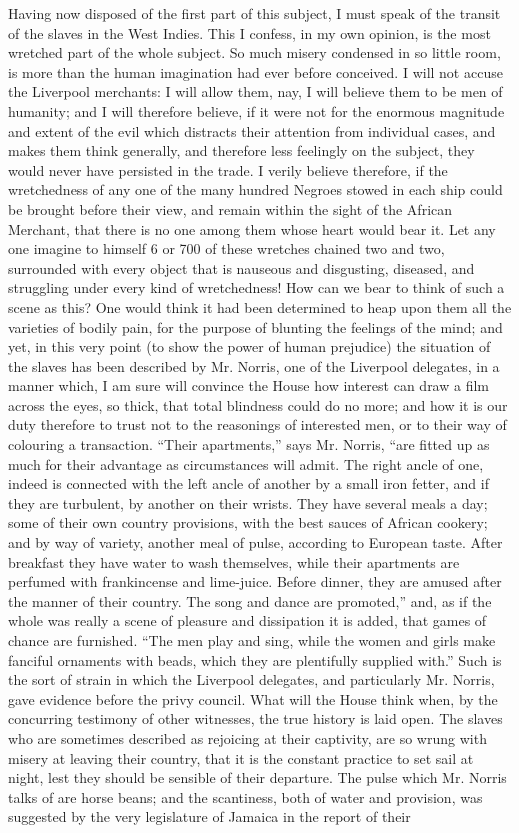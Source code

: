 \documentclass[a4paper]{amsbook}
\begin{document}
Having now disposed of the first part of this subject, I must speak of the transit of the slaves in the West Indies. This I confess, in my own opinion, is the most wretched part of the whole subject. So much misery condensed in so little room, is more than the human imagination had ever before conceived. I will not accuse the Liverpool merchants: I will allow them, nay, I will believe them to be men of humanity; and I will therefore believe, if it were not for the enormous magnitude and extent of the evil which distracts their attention from individual cases, and makes them think generally, and therefore less feelingly on the subject, they would never have persisted in the trade. I verily believe therefore, if the wretchedness of any one of the many hundred Negroes stowed in each ship could be brought before their view, and remain within the sight of the African Merchant, that there is no one among them whose heart would bear it. Let any one imagine to himself 6 or 700 of these wretches chained two and two, surrounded with every object that is nauseous and disgusting, diseased, and struggling under every kind of wretchedness! How can we bear to think of such a scene as this? One would think it had been determined to heap upon them all the varieties of bodily pain, for the purpose of blunting the feelings of the mind; and yet, in this very point (to show the power of human prejudice) the situation of the slaves has been described by Mr. Norris, one of the Liverpool delegates, in a manner which, I am sure will convince the House how interest can draw a film across the eyes, so thick, that total blindness could do no more; and how it is our duty therefore to trust not to the reasonings of interested men, or to their way of colouring a transaction. “Their apartments,” says Mr. Norris, “are fitted up as much for their advantage as circumstances will admit. The right ancle of one, indeed is connected with the left ancle of another by a small iron fetter, and if they are turbulent, by another on their wrists. They have several meals a day; some of their own country provisions, with the best sauces of African cookery; and by way of variety, another meal of pulse, according to European taste. After breakfast they have water to wash themselves, while their apartments are perfumed with frankincense and lime-juice. Before dinner, they are amused after the manner of their country. The song and dance are promoted,” and, as if the whole was really a scene of pleasure and dissipation it is added, that games of chance are furnished. “The men play and sing, while the women and girls make fanciful ornaments with beads, which they are plentifully supplied with.” Such is the sort of strain in which the Liverpool delegates, and particularly Mr. Norris, gave evidence before the privy council. What will the House think when, by the concurring testimony of other witnesses, the true history is laid open. The slaves who are sometimes described as rejoicing at their captivity, are so wrung with misery at leaving their country, that it is the constant practice to set sail at night, lest they should be sensible of their departure. The pulse which Mr. Norris talks of are horse beans; and the scantiness, both of water and provision, was suggested by the very legislature of Jamaica in the report of their 
\end{document}
